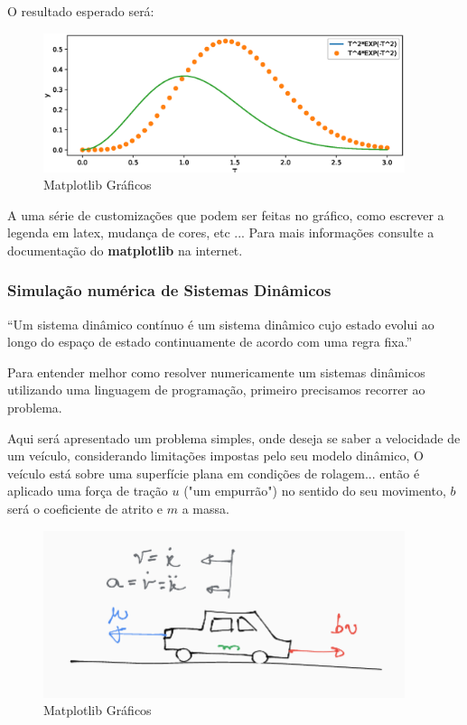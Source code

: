 O resultado esperado será:

\begin{figure}[htb]
    \includegraphics[width=300pt]{chapters/chapter0/figures/python_graph.eps}
    \caption[Desenhando Gráficos Manualmente]{Matplotlib Gráficos}
\end{figure}

A uma série de customizações que podem ser feitas no gráfico, como escrever a legenda em latex, mudança de cores, etc ... Para mais informações consulte a documentação do 
\textbf{matplotlib} na internet.

\subsubsection{Simulação numérica de Sistemas Dinâmicos}

\begin{VF}
    ``Um sistema dinâmico contínuo é um sistema dinâmico cujo estado evolui ao longo do espaço de estado continuamente de acordo com uma regra fixa.''
    
    \end{VF}

    Para entender melhor como resolver numericamente um sistemas dinâmicos utilizando uma linguagem de programação, primeiro precisamos recorrer ao problema.

    Aqui será apresentado um problema simples, onde deseja se saber a velocidade de um veículo, considerando limitações impostas pelo seu modelo dinâmico, O veículo está sobre uma superfície plana em condições de rolagem... então é aplicado uma força de tração $u$ ("um empurrão") no sentido do seu movimento, $b$ será o coeficiente de atrito e $m$ a massa.

\begin{figure}[htb]
    \includegraphics[width=300pt]{chapters/chapter0/figures/cruise_control_schematic.png}
    \caption[Desenhando Gráficos Manualmente]{Matplotlib Gráficos}
\end{figure}

